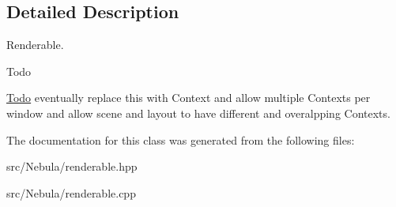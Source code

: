 \subsection{\-Detailed \-Description}
\-Renderable. 

\begin{DoxyRefDesc}{\-Todo}
\item[\hyperlink{todo__todo000013}{\-Todo}]eventually replace this with \-Context and allow multiple \-Contexts per window and allow scene and layout to have different and overalpping \-Contexts. \end{DoxyRefDesc}


\-The documentation for this class was generated from the following files\-:\begin{DoxyCompactItemize}
\item 
src/\-Nebula/renderable.\-hpp\item 
src/\-Nebula/renderable.\-cpp\end{DoxyCompactItemize}
